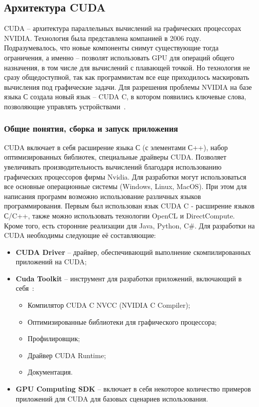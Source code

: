 \subsection{Архитектура CUDA}
\label{CUDA:section}
CUDA -- архитектура параллельных вычислений на графических процессорах NVIDIA. Технология была представлена компанией в 2006 году. Подразумевалось, что новые компоненты снимут существующие тогда ограничения, а именно -- позволят использовать GPU для операций общего назначения, в том числе для вычислений с плавающей точкой. Но технология не сразу общедоступной, так как программистам все еще приходилось маскировать вычисления под графические задачи. Для разрешения проблемы NVIDIA на базе языка С создала новый язык -- CUDA C, в котором появились ключевые слова, позволяющие управлять устройствами~\cite{KandrotSanders2022}.

\subsubsection*{Общие понятия, сборка и запуск приложения} 
CUDA включает в себя расширение языка С (с элементами С++), набор оптимизированных библиотек, специальные драйверы CUDA. Позволяет увеличивать производительность вычислений благодаря использованию графических процессоров фирмы Nvidia.
Для разработки могут использоваться все основные операционные системы (Windows, Linux, MacOS).
При этом для написания программ возможно использование различных языков программирования. Первым был использован язык CUDA C - расширение языков С/C++, также можно использовать технологии OpenCL и DirectCompute. Кроме того, есть сторонние реализации для Java, Python, C\#.
Для разработки на CUDA необходимы следующие её составляющие:
\begin{itemize}
    \item\textbf{CUDA Driver} -- драйвер, обеспечивающий выполнение скомпилированных приложений на CUDA;
    \item\textbf{Cuda Toolkit} -- инструмент для разработки приложений, включающий в себя~\cite{Gergel2016}:
    \begin{itemize}
        \item Компилятор CUDA C NVCC (NVIDIA C Compiler);
        \item Оптимизированные библиотеки для графического процессора;
        \item Профилировщик;
        \item Драйвер CUDA Runtime;
        \item Документация.
    \end{itemize}
    \item\textbf{GPU Computing SDK} -- включает в себя некоторое количество примеров приложений для CUDA для базовых сценариев использования.
\end{itemize}

